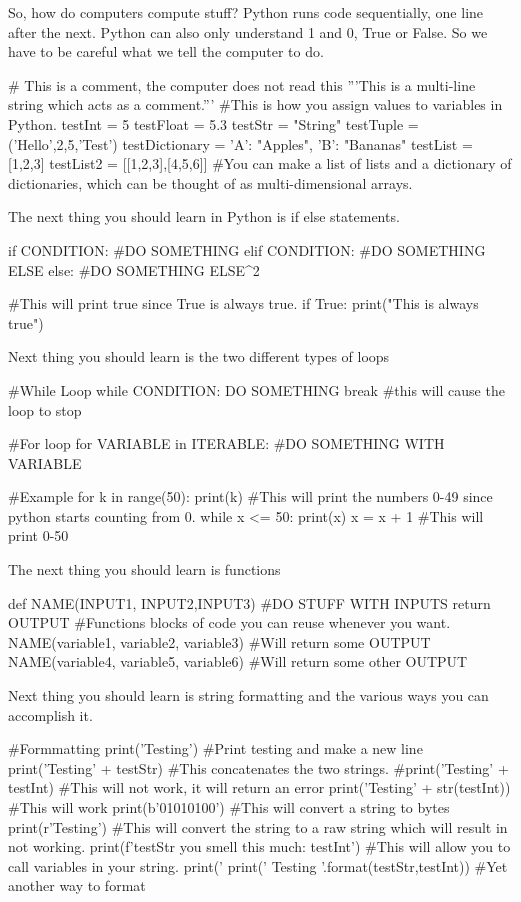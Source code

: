 \documentclass{article}
\begin{document}
So, how do computers compute stuff?
Python runs code sequentially, one line after the next. Python can also only understand 1 and 0, True or False.
So we have to be careful what we tell the computer to do.

\begin{python}
# This is a comment, the computer does not read this
'''This is a multi-line
string which acts 
as a comment.'''
#This is how you assign values to variables in Python.
testInt = 5
testFloat = 5.3
testStr = "String"
testTuple = ('Hello',2,5,'Test')
testDictionary = {'A': "Apples", 'B': "Bananas"}
testList = [1,2,3]
testList2 = [[1,2,3],[4,5,6]]
#You can make a list of lists and a dictionary of dictionaries, which can be thought of as multi-dimensional arrays.
\end{python}

The next thing you should learn in Python is if else statements.
\begin{python}
if CONDITION:
    #DO SOMETHING
elif CONDITION:
    #DO SOMETHING ELSE
else:
    #DO SOMETHING ELSE^2

#This will print true since True is always true.
if True:
    print("This is always true")
\end{python}
Next thing you should learn is the two different types of loops
\begin{python}
#While Loop
while CONDITION:
    DO SOMETHING
    break #this will cause the loop to stop
    
#For loop
for VARIABLE in ITERABLE:
    #DO SOMETHING WITH VARIABLE

#Example
for k in range(50):
    print(k) #This will print the numbers 0-49 since python starts counting from 0.
while x <= 50:
    print(x)
    x = x + 1 #This will print 0-50
\end{python}
The next thing you should learn is functions
\begin{python}
def NAME(INPUT1, INPUT2,INPUT3)
    #DO STUFF WITH INPUTS
    return OUTPUT
#Functions blocks of code you can reuse whenever you want.
NAME(variable1, variable2, variable3) #Will return some OUTPUT
NAME(variable4, variable5, variable6) #Will return some other OUTPUT
\end{python}
Next thing you should learn is string formatting and the various ways you can accomplish it.
\begin{python}
#Formmatting
print('Testing\n') #Print testing and make a new line
print('Testing' + testStr) #This concatenates the two strings.
#print('Testing' + testInt) #This will not work, it will return an error
print('Testing' + str(testInt)) #This will work
print(b'01010100') #This will convert a string to bytes
print(r'Testing\nTesting\nTestinng') #This will convert the string to a raw string which will result in \n not working.
print(f'{testStr} you smell this much: {testInt}') #This will allow you to call variables in your string.
print('%
print('{} Testing {}'.format(testStr,testInt)) #Yet another way to format
\end{python}
\end{document}

